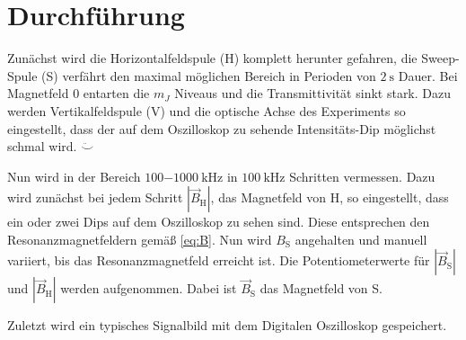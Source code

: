 

\section{Durchführung}
\label{sub:durchfuehrung}
	
	Zunächst wird die Horizontalfeldspule (H) komplett herunter 
		gefahren, die Sweep-Spule (S) verfährt den maximal möglichen 
		Bereich in Perioden von $\SI{2}{\second}$ Dauer. Bei Magnetfeld 
		$0$ 
		entarten die $m_J$ Niveaus und 
		die Transmittivität sinkt stark. Dazu werden Vertikalfeldspule (V) 
		und die optische Achse des Experiments so eingestellt, dass 
		der auf dem Oszilloskop zu sehende Intensitäts-Dip möglichst 
		schmal wird. $\ddot \smile$
	
	
	Nun wird in der Bereich $\SI{100-1000}{\kilo\hertz}$ in 
		$\SI{100}{\kilo\hertz}$ Schritten vermessen. Dazu wird zunächst 
		bei jedem Schritt $|\vec{B}_\text{H}|$, das Magnetfeld von H, so
		 eingestellt, dass ein oder zwei Dips 
		auf dem Oszilloskop zu sehen sind. Diese entsprechen den 
		Resonanzmagnetfeldern gemäß \eqref{eq:B}. 
		Nun wird $B_\text{S}$ angehalten und manuell variiert, bis das 
		Resonanzmagnetfeld 
		erreicht ist. Die Potentiometerwerte für $|\vec{B}_\text{S}|$ und 
		$|\vec{B}_\text{H}|$ werden aufgenommen. Dabei ist 
		$\vec{B}_\text{S}$ das Magnetfeld von S.
	
	 Zuletzt wird ein typisches Signalbild mit dem 
		Digitalen Oszilloskop gespeichert.
	
